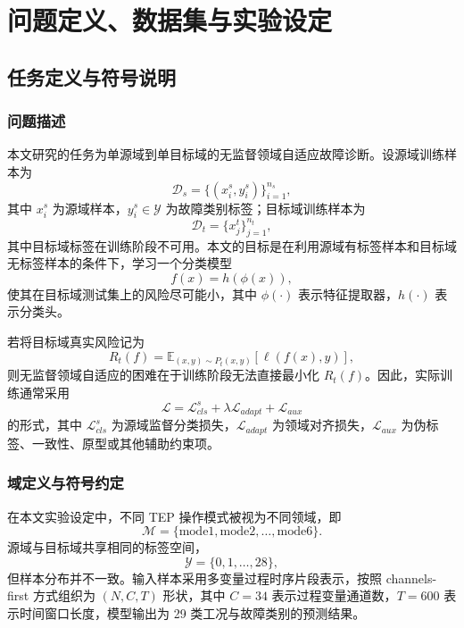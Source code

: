 \chapter{问题定义、数据集与实验设定}

\section{任务定义与符号说明}
\subsection{问题描述}
本文研究的任务为单源域到单目标域的无监督领域自适应故障诊断。设源域训练样本为
\begin{equation}
\mathcal{D}_s=\{(x_i^s,y_i^s)\}_{i=1}^{n_s},
\end{equation}
其中 $x_i^s$ 为源域样本，$y_i^s\in\mathcal{Y}$ 为故障类别标签；目标域训练样本为
\begin{equation}
\mathcal{D}_t=\{x_j^t\}_{j=1}^{n_t},
\end{equation}
其中目标域标签在训练阶段不可用。本文的目标是在利用源域有标签样本和目标域无标签样本的条件下，学习一个分类模型
\begin{equation}
f(x)=h(\phi(x)),
\end{equation}
使其在目标域测试集上的风险尽可能小，其中 $\phi(\cdot)$ 表示特征提取器，$h(\cdot)$ 表示分类头。

若将目标域真实风险记为
\begin{equation}
R_t(f)=\mathbb{E}_{(x,y)\sim P_t(x,y)}[\ell(f(x),y)],
\end{equation}
则无监督领域自适应的困难在于训练阶段无法直接最小化 $R_t(f)$。因此，实际训练通常采用
\begin{equation}
\mathcal{L}=\mathcal{L}_{cls}^s+\lambda \mathcal{L}_{adapt}+\mathcal{L}_{aux}
\end{equation}
的形式，其中 $\mathcal{L}_{cls}^s$ 为源域监督分类损失，$\mathcal{L}_{adapt}$ 为领域对齐损失，$\mathcal{L}_{aux}$ 为伪标签、一致性、原型或其他辅助约束项。

\subsection{域定义与符号约定}
在本文实验设定中，不同 TEP 操作模式被视为不同领域，即
\begin{equation}
\mathcal{M}=\{\mathrm{mode1},\mathrm{mode2},\ldots,\mathrm{mode6}\}.
\end{equation}
源域与目标域共享相同的标签空间，
\begin{equation}
\mathcal{Y}=\{0,1,\ldots,28\},
\end{equation}
但样本分布并不一致。输入样本采用多变量过程时序片段表示，按照 channels-first 方式组织为 $(N,C,T)$ 形状，其中 $C=34$ 表示过程变量通道数，$T=600$ 表示时间窗口长度，模型输出为 29 类工况与故障类别的预测结果。

